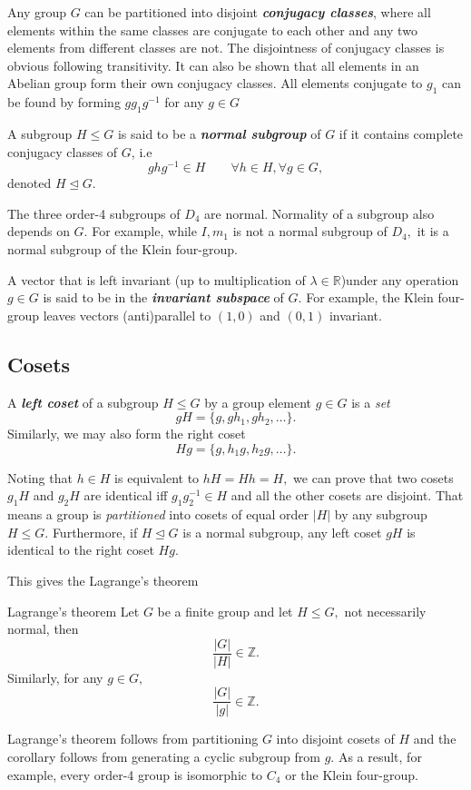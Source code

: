 \documentclass{article}
\begin{document}
Any group $G$ can be partitioned into disjoint \textit{\textbf{conjugacy classes}}, where all elements within the same classes are conjugate to each other and any two elements from different classes are not. The disjointness of conjugacy classes is obvious following transitivity. It can also be shown that all elements in an Abelian group form their own conjugacy classes. All elements conjugate to $g_1$ can be found by forming $g g_1 g^{-1}$ for any $g \in G$

A subgroup $H \leq G$ is said to be a \textit{\textbf{normal subgroup}} of $G$ if it contains complete conjugacy classes of $G$, i.e
\[
    \boxed{g h g^{-1} \in H \qquad \forall h \in H, \forall g \in G, }  
\]
denoted $H \unlhd G.$

The three order-4 subgroups of $D_4$ are normal. Normality of a subgroup also depends on $G.$ For example, while ${I, m_1}$ is not a normal subgroup of $D_4,$ it is a normal subgroup of the Klein four-group. 

A vector that is left invariant (up to multiplication of $\lambda \in \mathbb{R}$)under any operation $g \in G$ is said to be in the \textit{\textbf{invariant subspace}} of $G.$ For example, the Klein four-group leaves vectors (anti)parallel
to $(1,0)$ and $(0,1)$ invariant. 
\subsection{Cosets}
A \textit{\textbf{left coset}} of a subgroup $H \leq  G$ by a group element $g \in G$ is a \textit{set}
\[
    gH = \{ g, gh_1, gh_2, \ldots  \}. 
\]
Similarly, we may also form the right coset
\[
    Hg = \{ g, h_1 g, h_2 g, \ldots  \}.
\]

Noting that $h \in H$ is equivalent to $h H = H h = H,$ we can prove that two cosets $g_1 H$ and $g_2 H$ are identical iff $g_1 g_2^{-1} \in H$ and all the other cosets are disjoint. That means a group is \textit{partitioned} into cosets of equal order $\left\vert H \right\vert $ by any subgroup $H \leq G.$ Furthermore, if $H \unlhd G$ is a normal subgroup, any left coset $gH$ is identical to the right coset $Hg.$ 

This gives the Lagrange's theorem
\begin{frm-thm}{Lagrange's theorem}
Let $G$ be a finite group and let $H\leq G,$ not necessarily normal, then
\[
    \frac{\left\vert G \right\vert }{\left\vert H \right\vert } \in \mathbb{Z}. 
\]
Similarly, for any $g \in G,$
\[
    \frac{\left\vert G \right\vert }{\left\vert g \right\vert } \in \mathbb{Z}.
\]
\end{frm-thm}
Lagrange's theorem follows from partitioning $G$ into disjoint cosets of $H$ and the corollary follows from generating a cyclic subgroup from $g.$ As a result, for example, every order-4 group is isomorphic to $C_4$ or the Klein four-group. 
\end{document}
